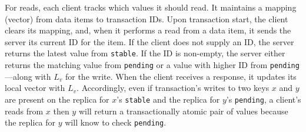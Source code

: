 For reads, each client tracks which values it should read. It
maintains a mapping (vector) from data items to transaction IDs. Upon
transaction start, the client clears its mapping, and, when it
performs a read from a data item, it sends the server its current ID
for the item. If the client does not supply an ID, the server returns
the latest value from \texttt{stable}. If the ID is non-empty, the
server either returns the matching value from \texttt{pending} or a
value with higher ID from \texttt{pending}---along with $L_v$ for the
write. When the client receives a response, it updates its local
vector with $L_v$. Accordingly, even if transaction's writes to two
keys $x$ and $y$ are present on the replica for $x$'s \texttt{stable}
and the replica for $y$'s \texttt{pending}, a client's reads from $x$
then $y$ will return a transactionally atomic pair of values because
the replica for $y$ will know to check \texttt{pending}.


